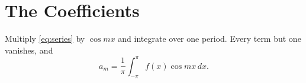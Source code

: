 \section{The Coefficients}\label{sec:coefficients}
Multiply \eqref{eq:series} by $\cos mx$ and integrate over one period.
Every term but one vanishes, and
\begin{equation}\label{eq:coefficients}
  a_m = \frac{1}{\pi}\int_{-\pi}^{\pi} f(x)\cos mx\,dx .
\end{equation}
